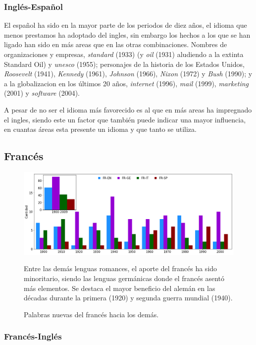 \subsubsection*{Inglés-Español} %
El español ha sido en la mayor parte de los periodos de diez años,  el idioma
que menos prestamos ha adoptado del ingles, sin embargo los hechos a los que se
han ligado han sido en más areas que en las otras combinaciones.  Nombres de
organizaciones y empresas,  \textit{standard} (1933) (y \textit{oil} (1931)
aludiendo a la extinta Standard Oil) y \textit{unesco} (1955);  personajes de
la historia de los Estados Unidos,  \textit{Roosevelt} (1941), \textit{Kennedy}
(1961), \textit{Johnson} (1966),  \textit{Nixon} (1972) y \textit{Bush} (1990);
y a la globalizacion en los últimos 20 años, \textit{internet} (1996),
\textit{mail} (1999), \textit{marketing} (2001) y \textit{software} (2004).   

A pesar de no ser el idioma más favorecido es al que en más areas ha impregnado
el ingles, siendo este un factor que también puede indicar una mayor
influencia,  en cuantas áreas esta presente un idioma y que tanto se utiliza. 

\subsection{Francés} %

\begin{figure}[h!]
	\centering
	\includegraphics[scale=.38]{Cap_3/NC_FR.png}
	\label{fig.NC_FR}
	\caption{Palabras nuevas del francés hacia los demás.}
	\smallskip
	\small
	Entre las demás lenguas romances, el aporte del francés ha sido minoritario, siendo las lenguas germánicas donde el francés asentó más elementos. Se destaca el mayor beneficio del alemán en las décadas durante la primera (1920) y segunda guerra mundial (1940).
	
	
\end{figure}

\subsubsection*{Francés-Inglés}%


